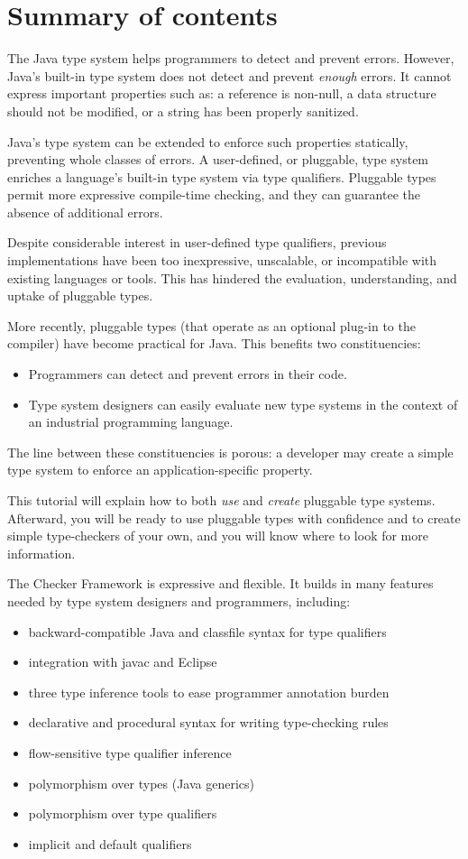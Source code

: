 \documentclass{sig-alternate} %
\begin{document}
\section{Summary of contents}

The Java type system helps programmers to detect and prevent
errors. However, Java's built-in type system does not detect and prevent
\emph{enough} errors. It cannot express important properties such as: a reference
is non-null, a data structure should not be modified, or a string has been
properly sanitized.

Java's type system can be extended to enforce such properties statically,
preventing whole classes of errors. 
A user-defined, or pluggable, type system enriches a
language's built-in type system via type qualifiers.  Pluggable types
permit more expressive compile-time checking, and they can guarantee
the absence of additional errors.

Despite considerable interest in user-defined type qualifiers,
previous implementations have been too inexpressive, unscalable, or
incompatible with existing languages or tools.  This has hindered the
evaluation, understanding, and uptake of pluggable types.

More recently, pluggable types (that operate as an optional plug-in to the
compiler) have become practical for Java. This benefits two constituencies:

\begin{itemize}
\item Programmers can detect and prevent errors in their code.
\item Type system designers can easily evaluate new type systems in the
  context of an industrial programming language.
\end{itemize}

The line between these constituencies is porous: a developer may create a
simple type system to enforce an application-specific property.

This tutorial will explain how to both \emph{use} and \emph{create}
pluggable type systems. Afterward, you will be ready to use pluggable types
with confidence and to create simple type-checkers of your own, and you
will know where to look for more information.

The Checker Framework is expressive and flexible.  It builds in many
features needed by type system designers and programmers, including:
\begin{itemize}
\item backward-compatible Java and classfile syntax for type qualifiers
\item integration with javac and Eclipse
\item three type inference tools to ease programmer annotation burden
\item declarative and procedural syntax for writing type-checking rules
\item flow-sensitive type qualifier inference
\item polymorphism over types (Java generics)
\item polymorphism over type qualifiers
\item implicit and default qualifiers
\end{itemize}
\end{document}
